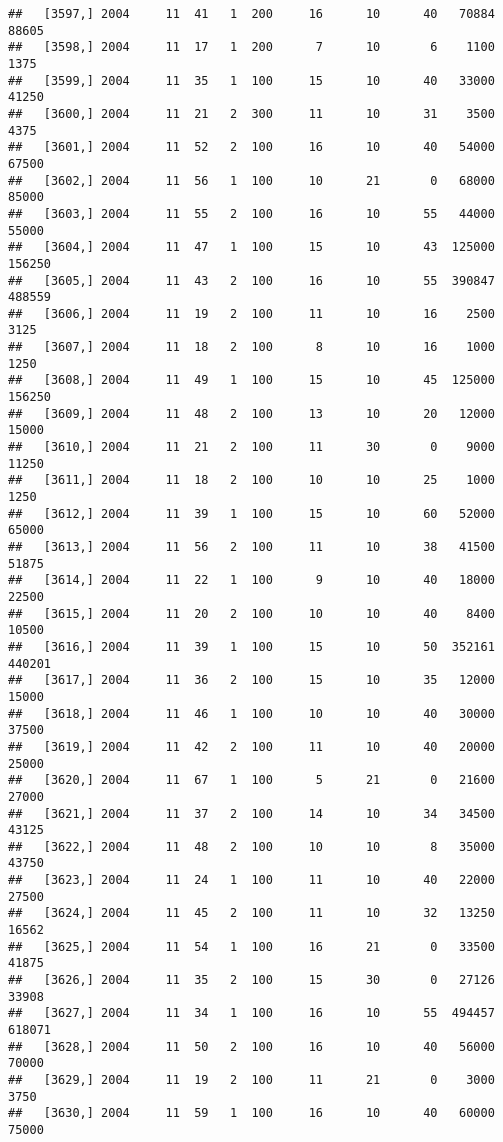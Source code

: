 \documentclass{article}\usepackage[]{graphicx}\usepackage[]{color}
\makeatletter
\newenvironment{kframe}{%
 \def\at@end@of@kframe{}%
 \ifinner\ifhmode%
  \def\at@end@of@kframe{\end{minipage}}%
  \begin{minipage}{\columnwidth}%
 \fi\fi%
 \def\FrameCommand##1{\hskip\@totalleftmargin \hskip-\fboxsep
 \colorbox{shadecolor}{##1}\hskip-\fboxsep
     \hskip-\linewidth \hskip-\@totalleftmargin \hskip\columnwidth}%
 \MakeFramed {\advance\hsize-\width
   \@totalleftmargin\z@ \linewidth\hsize
   \@setminipage}}%
 {\par\unskip\endMakeFramed%
 \at@end@of@kframe}
\newenvironment{knitrout}{}{} %
\makeatother
\begin{document}
\begin{knitrout}
\begin{kframe}
\begin{verbatim}
##   [3597,] 2004     11  41   1  200     16      10      40   70884   88605
##   [3598,] 2004     11  17   1  200      7      10       6    1100    1375
##   [3599,] 2004     11  35   1  100     15      10      40   33000   41250
##   [3600,] 2004     11  21   2  300     11      10      31    3500    4375
##   [3601,] 2004     11  52   2  100     16      10      40   54000   67500
##   [3602,] 2004     11  56   1  100     10      21       0   68000   85000
##   [3603,] 2004     11  55   2  100     16      10      55   44000   55000
##   [3604,] 2004     11  47   1  100     15      10      43  125000  156250
##   [3605,] 2004     11  43   2  100     16      10      55  390847  488559
##   [3606,] 2004     11  19   2  100     11      10      16    2500    3125
##   [3607,] 2004     11  18   2  100      8      10      16    1000    1250
##   [3608,] 2004     11  49   1  100     15      10      45  125000  156250
##   [3609,] 2004     11  48   2  100     13      10      20   12000   15000
##   [3610,] 2004     11  21   2  100     11      30       0    9000   11250
##   [3611,] 2004     11  18   2  100     10      10      25    1000    1250
##   [3612,] 2004     11  39   1  100     15      10      60   52000   65000
##   [3613,] 2004     11  56   2  100     11      10      38   41500   51875
##   [3614,] 2004     11  22   1  100      9      10      40   18000   22500
##   [3615,] 2004     11  20   2  100     10      10      40    8400   10500
##   [3616,] 2004     11  39   1  100     15      10      50  352161  440201
##   [3617,] 2004     11  36   2  100     15      10      35   12000   15000
##   [3618,] 2004     11  46   1  100     10      10      40   30000   37500
##   [3619,] 2004     11  42   2  100     11      10      40   20000   25000
##   [3620,] 2004     11  67   1  100      5      21       0   21600   27000
##   [3621,] 2004     11  37   2  100     14      10      34   34500   43125
##   [3622,] 2004     11  48   2  100     10      10       8   35000   43750
##   [3623,] 2004     11  24   1  100     11      10      40   22000   27500
##   [3624,] 2004     11  45   2  100     11      10      32   13250   16562
##   [3625,] 2004     11  54   1  100     16      21       0   33500   41875
##   [3626,] 2004     11  35   2  100     15      30       0   27126   33908
##   [3627,] 2004     11  34   1  100     16      10      55  494457  618071
##   [3628,] 2004     11  50   2  100     16      10      40   56000   70000
##   [3629,] 2004     11  19   2  100     11      21       0    3000    3750
##   [3630,] 2004     11  59   1  100     16      10      40   60000   75000

\end{verbatim}
\end{kframe}
\end{knitrout}
\end{document}
